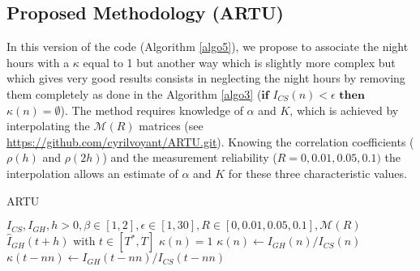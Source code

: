 \documentclass[preprint,12pt,3p]{elsarticle}
\begin{document}
  \subsection{Proposed Methodology \textnormal{(ARTU)}}
 \label{algo:METH}
In this version of the code (Algorithm \ref{algo5}), we propose to associate the night hours with a $\kappa$ equal to 1 but another way which is slightly more complex but which gives very good results consists in neglecting the night hours by removing them completely as done in the Algorithm \ref{algo3} ($\mathbf{if}$ $I_{CS}(n)<\epsilon$ $\mathbf{then}$ $\kappa(n)=\emptyset$). The method requires knowledge of $\alpha$ and $K$, which is achieved by interpolating the $\mathcal{M}(R)$ matrices (see \url{https://github.com/cyrilvoyant/ARTU.git}). Knowing the correlation coefficients ($\rho(h)$ and $\rho(2h) $) and the measurement reliability ($R = 0,0.01,0.05,0.1)$ the interpolation allows an estimate of $\alpha$ and $K$ for these three characteristic values.

\begin{algorithm}
\caption{ARTU}
\begin{algorithmic} 
\label{algo5}
\REQUIRE $ I_{CS}, I_{GH},h>0,\beta \in [1,2], \epsilon \in [1,30], R \in [0,0.01,0.05,0.1], \mathcal{M}(R) $
\ENSURE $\widehat{I}_{GH}(t+h)$ with $t \in [T^*,T]$
\STATE$\kappa(n)=1$
\ELSE
\STATE $\kappa(n) \leftarrow I_{GH}(n)/I_{CS}(n)$
\ENDIF
\ENDFOR
{}
\ELSE
\STATE $\kappa(t-nn) \leftarrow I_{GH}(t-nn)/I_{CS}(t-nn)$
\ENDIF
\ENDFOR
{}
\end{algorithmic}
\end{algorithm}



\end{document}
